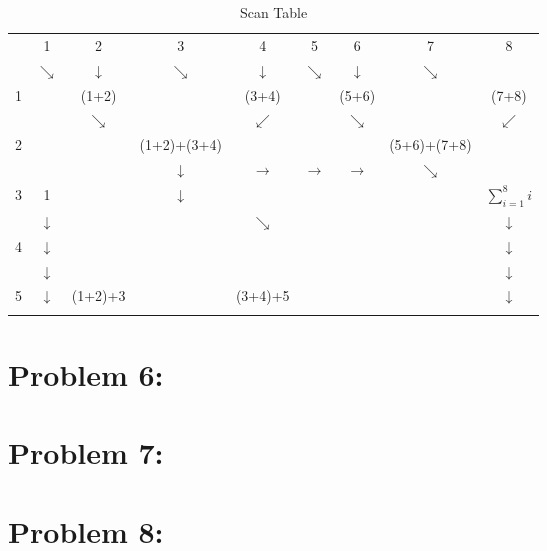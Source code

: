 \documentclass[12pt]{article}
\begin{document}
\begin{table}[]
\centering
\caption{Scan Table}
\label{my-label}
\begin{tabular}{c|c|c|c|c|c|c|c|c|}
                       & 1              & 2       & 3           & 4       & 5                       & 6     & 7                         & 8                                   \\\cline{2-9} 
 & {$\searrow$} &{$\downarrow$}&{$\searrow$}&{$\downarrow$}&{$\searrow$}&{$\downarrow$}&{$\searrow$}&\\\cline{2-9}
1 &                & (1+2)   &             & (3+4)   &                         & (5+6) &                           & (7+8)\\\cline{2-9}
&                &{$\searrow$}&             &{$\swarrow$}&&{$\searrow$}& &{$\swarrow$} \\\cline{2-9}
2&                &         & (1+2)+(3+4) &         &                         &       & (5+6)+(7+8)               &  \\\cline{2-9}
&&         &{$\downarrow$}&{$\rightarrow$}&{$\rightarrow$}&{$\rightarrow$}& {$\searrow$}&   \\\cline{2-9}
3& 1              &         &{$\downarrow$}  &         &                         &       &                           & $\sum\limits_{i=1}^{8} i$\\\cline{2-9}
& {$\downarrow$} &         &             & {$\searrow$} &                         &       &                           &        {$\downarrow$} \\\cline{2-9}
4&{$\downarrow$}&         &             &         &  &       &                           &   {$\downarrow$} \\\cline{2-9}
& {$\downarrow$}&         &             &         &                         &       &                           &{$\downarrow$}  \\\cline{2-9}
5& {$\downarrow$}& (1+2)+3 &             & (3+4)+5 &                         &       &  &      {$\downarrow$} \\\cline{2-9}
&                &         &             &         &                         &       &                           &                                    
\end{tabular}
\end{table}
\section*{Problem 6: }
\section*{Problem 7: }
\section*{Problem 8: }
\end{document}

